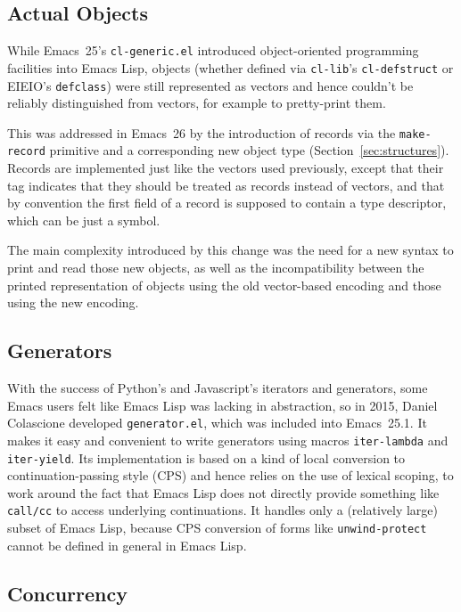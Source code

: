 \documentclass[format=acmsmall,screen]{acmart}
\newcommand \Elisp {Emacs Lisp}
\begin{document}
\subsection{Actual Objects}  %
\label{sec:actual-objects}

While Emacs~25's \texttt{cl-generic.el} introduced object-oriented
programming facilities into \Elisp{}, objects (whether defined via
\texttt{cl-lib}'s \texttt{cl-defstruct} or EIEIO's \texttt{defclass}) were
still represented as vectors and hence couldn't be reliably distinguished
from vectors, for example to pretty-print them.

This was addressed in Emacs~26 by the introduction of records via the
\texttt{make-record} primitive and a corresponding new object type
(Section~\ref{sec:structures}).
Records are implemented just like the vectors used previously,
except that their tag indicates that they should be treated as records
instead of vectors, and that by convention the first field of a record is
supposed to contain a type descriptor, which can be just a symbol.

The main complexity introduced by this change was the need for a new syntax
to print and read those new objects, as well as the incompatibility between
the printed representation of objects using the old vector-based encoding
and those using the new encoding.

\subsection{Generators}
\label{sec:generators}

With the success of Python's and Javascript's iterators and generators, some
Emacs users felt like \Elisp{} was lacking in abstraction, so in 2015,
Daniel Colascione developed \texttt{generator.el}, which was included
into Emacs~25.1.  It makes it easy and convenient to write generators using
macros \texttt{iter-lambda} and \texttt{iter-yield}.  Its implementation is
based on a kind of local conversion to continuation-passing style (CPS) and
hence relies on the use of lexical scoping, to work around the
fact that \Elisp{} does not directly provide something like \texttt{call/cc}
to access underlying continuations.  It handles only a (relatively large)
subset of \Elisp{}, because CPS conversion of forms like
\texttt{unwind-protect}~\cite{HaynesFriedman1987} cannot be defined in general in \Elisp.

\subsection{Concurrency}
\label{sec:concurrency}
\end{document}
